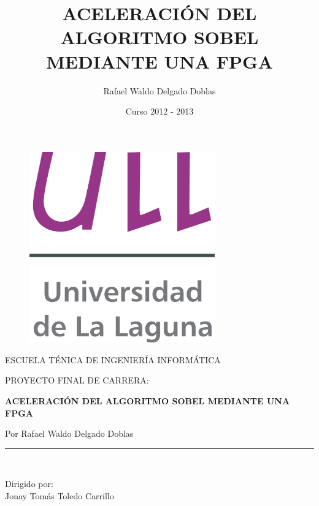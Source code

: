 \documentclass[a4paper,12pt,titlepage,final]{book}
\title{\Huge ACELERACIÓN DEL ALGORITMO SOBEL MEDIANTE UNA FPGA}
\author{Rafael Waldo Delgado Doblas}
\date{Curso 2012 - 2013}
\begin{document}
\frontmatter

\begin{titlepage}
\begin{center}
\vspace*{-1in}
\begin{figure}[htb]
\begin{center}
\includegraphics[width=8cm]{./figuras/Logo_ULL.png}
\end{center}
\end{figure}
\vspace*{0.15in}
ESCUELA TÉNICA DE INGENIERÍA INFORMÁTICA\\
\vspace*{0.6in}
\begin{large}
PROYECTO FINAL DE CARRERA:\\
\end{large}
\vspace*{0.2in}
\begin{Large}
\textbf{ACELERACIÓN DEL ALGORITMO SOBEL MEDIANTE UNA FPGA} \\
\end{Large}
\vspace*{0.3in}
\begin{large}
Por Rafael Waldo Delgado Doblas\\
\end{large}
\vspace*{0.3in}
\rule{80mm}{0.1mm}\\
\vspace*{0.1in}
\begin{large}
Dirigido por: \\
Jonay Tomás Toledo Carrillo \\
\end{large}
\end{center}
\end{titlepage}
\end{document}
